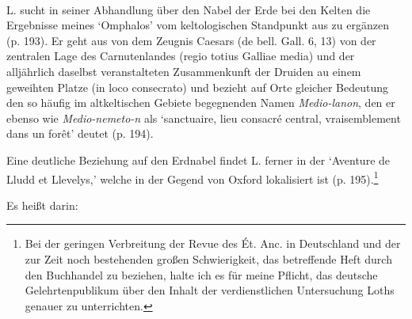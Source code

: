 \documentclass[a4paper, 11pt, oneside]{article}
\begin{document}
\paragraph{}
L. sucht in seiner Abhandlung über den Nabel der Erde bei den Kelten die Ergebnisse meines `Omphalos' vom keltologischen Standpunkt aus zu ergänzen (p. 193). Er geht aus von dem Zeugnis Caesars (de bell. Gall. 6, 13) von der zentralen Lage des Carnutenlandes (regio totius Galliae media) und der alljährlich daselbst veranstalteten Zusammenkunft der Druiden au einem geweihten Platze (in loco consecrato) und bezieht auf Orte gleicher Bedeutung den so häufig im altkeltischen Gebiete begegnenden Namen \emph{Medio-lanon}, den er ebenso wie \emph{Medio-nemeto-n} als `sanctuaire, lieu consacré central, vraisemblement dans un forêt' deutet (p. 194).

Eine deutliche Beziehung auf den Erdnabel findet L. ferner in der `Aventure de Lludd et Llevelys,' welche in der Gegend von Oxford lokalisiert ist (p. 195).\footnote{Bei der geringen Verbreitung der Revue des Ét. Anc. in Deutschland und der zur Zeit noch bestehenden großen Schwierigkeit, das betreffende Heft durch den Buchhandel zu beziehen, halte ich es für meine Pflicht, das deutsche Gelehrtenpublikum über den Inhalt der verdienstlichen Untersuchung Loths genauer zu unterrichten.}

Es heißt darin:
\end{document}
